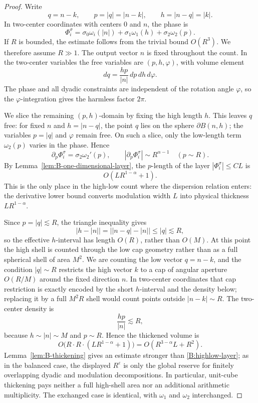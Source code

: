 \documentclass[10pt]{amsart}
\numberwithin{equation}{section}
\theoremstyle{plain}
\theoremstyle{definition}
\theoremstyle{remark}
\newcommand{\eps}{\varepsilon}
\begin{document}
\begin{proof}
Write
\[
        q=n-k,
        \qquad
        p=|q|=|n-k|,
        \qquad
        h=|n-q|=|k|.
\]
In two-center coordinates with centers \(0\) and \(n\), the phase is
\[
        \Phi_i^\sigma
        =
        \sigma_0\omega_i(|n|)+\sigma_1\omega_1(h)+\sigma_2\omega_2(p).
\]
If \(R\) is bounded, the estimate follows from the trivial bound \(O(R^3)\).  We therefore assume \(R\gg1\).  The output vector \(n\) is fixed throughout the count.  In the two-center variables the free variables are \((p,h,\varphi)\), with volume element
\[
        dq=\frac{hp}{|n|}\,dp\,dh\,d\varphi.
\]
The phase and all dyadic constraints are independent of the rotation angle \(\varphi\), so the \(\varphi\)-integration gives the harmless factor \(2\pi\).

We slice the remaining \((p,h)\)-domain by fixing the high length \(h\).  This leaves \(q\) free: for fixed \(n\) and \(h=|n-q|\), the point \(q\) lies on the sphere \(\partial B(n,h)\); the variables \(p=|q|\) and \(\varphi\) remain free.  On such a slice, only the low-length term \(\omega_2(p)\) varies in the phase.  Hence
\[
        \partial_p\Phi_i^\sigma=\sigma_2\omega_2'(p),
        \qquad
        |\partial_p\Phi_i^\sigma|\sim R^{\alpha-1}
        \quad (p\sim R).
\]
By Lemma~\ref{lem:B-one-dimensional-layer}, the \(p\)-length of the layer \(|\Phi_i^\sigma|\le CL\) is
\[
        O(LR^{1-\alpha}+1).
\]
This is the only place in the high-low count where the dispersion relation enters: the derivative lower bound converts modulation width \(L\) into physical thickness \(LR^{1-\alpha}\).

Since \(p=|q|\lesssim R\), the triangle inequality gives
\[
        |h-|n||=\bigl||n-q|-|n|\bigr|\le |q|\lesssim R,
\]
so the effective \(h\)-interval has length \(O(R)\), rather than \(O(M)\).  At this point the high shell is counted through the low cap geometry rather than as a full spherical shell of area \(M^2\).  We are counting the low vector \(q=n-k\), and the condition \(|q|\sim R\) restricts the high vector \(k\) to a cap of angular aperture \(O(R/M)\) around the fixed direction \(n\).  In two-center coordinates that cap restriction is exactly encoded by the short \(h\)-interval and the density below; replacing it by a full \(M^2R\) shell would count points outside \(|n-k|\sim R\).  The two-center density is
\[
        \frac{hp}{|n|}\lesssim R,
\]
because \(h\sim |n|\sim M\) and \(p\sim R\).  Hence the thickened volume is
\[
        O\bigl(R\cdot R\cdot(LR^{1-\alpha}+1)\bigr)
        =O(R^{3-\alpha}L+R^2).
\]
Lemma~\ref{lem:B-thickening} gives an estimate stronger than \eqref{B:highlow-layer}; as in the balanced case, the displayed \(R^\eps\) is only the global reserve for finitely overlapping dyadic and modulation decompositions.  In particular, unit-cube thickening pays neither a full high-shell area nor an additional arithmetic multiplicity.  The exchanged case is identical, with \(\omega_1\) and \(\omega_2\) interchanged.
\end{proof}
\end{document}
